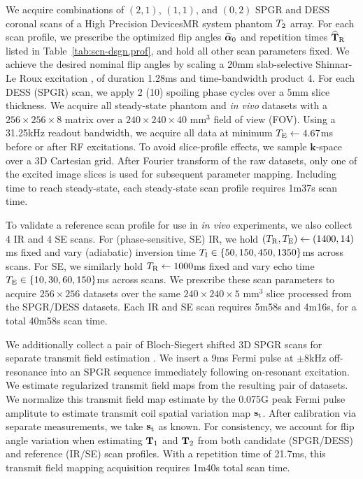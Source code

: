 We acquire combinations 
of $(2,1)$, $(1,1)$, and $(0,2)$ SPGR and DESS coronal scans 
of a High Precision Devices\regis MR system phantom $T_2$ array.
For each scan profile, 
we prescribe the optimized flip angles $\widehat{\boldsymbol{\alpha}}_0$ 
and repetition times $\widehat{\mathbf{T}}_{\mathrm{R}}$ 
listed in Table~\ref{tab:scn-dsgn,prof},
 and hold all other scan parameters fixed. 
We achieve the desired nominal flip angles 
by scaling a 20mm slab-selective Shinnar-Le Roux excitation \cite{pauly:91:prf}, 
of duration 1.28ms and time-bandwidth product 4. 
For each DESS (SPGR) scan, 
we apply 2 (10) spoiling phase cycles 
over a $5$mm slice thickness. 
We acquire all steady-state phantom and \emph{in vivo} datasets 
with a $256 \times 256 \times 8$ matrix 
over a $240 \times 240 \times 40$ mm$^3$ field of view (FOV). 
Using a 31.25kHz readout bandwidth, 
we acquire all data at minimum $T_\mathrm{E} \gets 4.67$ms 
before or after RF excitations. 
To avoid slice-profile effects, 
we sample $\mathbf{k}$-space over a 3D Cartesian grid. 
After Fourier transform of the raw datasets, 
only one of the excited image slices 
is used for subsequent parameter mapping. 
Including time to reach steady-state, 
each steady-state scan profile requires 1m37s scan time.

To validate a reference scan profile 
for use in \emph{in vivo} experiments, 
we also collect 4 IR and 4 SE scans.
For (phase-sensitive, SE) IR, 
we hold $(T_\mathrm{R}, T_\mathrm{E}) \gets (1400, 14)$ms fixed 
and vary (adiabatic) inversion time 
$\TI \in \set{50, 150, 450, 1350}$ms across scans.
For SE, we similarly hold $T_\mathrm{R} \gets 1000$ms fixed 
and vary echo time $\TE \in \set{10, 30, 60, 150}$ms across scans.
We prescribe these scan parameters 
to acquire $256 \times 256$ datasets 
over the same $240 \times 240 \times 5$ mm$^3$ slice processed 
from the SPGR/DESS datasets. 
Each IR and SE scan requires 5m58s and 4m16s, 
for a total 40m58s scan time.

We additionally collect a pair 
of Bloch-Siegert shifted 3D SPGR scans 
for separate transmit field estimation 
\cite{sacolick:10:bmb}. 
We insert a 9ms Fermi pulse 
at $\pm8$kHz off-resonance
into an SPGR sequence immediately following on-resonant excitation.
We estimate regularized transmit field maps \cite{sun:14:reo}
from the resulting pair of datasets.
We normalize this transmit field map estimate
by the 0.075G peak Fermi pulse amplitute
to estimate transmit coil spatial variation map $\mathbf{s}_\mathrm{t}$.
After calibration via separate measurements,
we take $\mathbf{s}_\mathrm{t}$ as known.
For consistency, we account for flip angle variation 
when estimating $\mathbf{T}_1$ and $\mathbf{T}_2$ 
from both candidate (SPGR/DESS) 
and reference (IR/SE) scan profiles.
With a repetition time of 21.7ms, 
this transmit field mapping acquisition requires 
1m40s total scan time.

